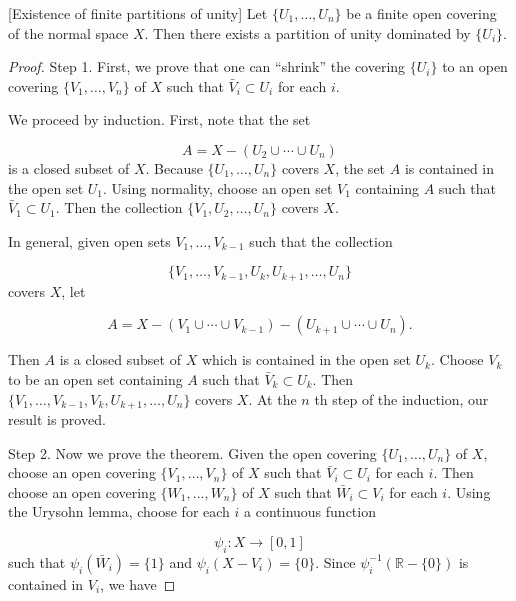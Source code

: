 \begin{theorem}
\label{thm:\thetheorem}[Existence of finite partitions of unity]
 Let \(\{ {U_{1},\ldots ,U_{n}}\}\) be a finite open covering of the normal space \(X\). Then there exists a partition of unity dominated by \(\{ U_{i}\}\).

\end{theorem}
\begin{proof}
 Step 1. First, we prove that one can ``shrink'' the covering \(\{ U_{i}\}\) to an open covering \(\{ {V_{1},\ldots ,V_{n}}\}\) of \(X\) such that \(\bar{V}_{i} \subset {U}_{i}\) for each \(i\).

We proceed by induction. First, note that the set

\[
A = X - ( {U_{2} \cup \cdots \cup {U}_{n}})
\]
is a closed subset of \(X\). Because \(\{ {U_{1},\ldots ,U_{n}}\}\) covers \(X\), the set \(A\) is contained in the open set \(U_{1}\). Using normality, choose an open set \(V_{1}\) containing \(A\) such that \(\bar{V}_{1} \subset {U}_{1}\). Then the collection \(\{ {V_{1},U_{2},\ldots ,U_{n}}\}\) covers \(X\).

In general, given open sets \(V_{1},\ldots ,V_{k - 1}\) such that the collection

\[
\{ {V_{1},\ldots ,V_{k - 1},U_{k},U_{k + 1},\ldots ,U_{n}}\}
\]
covers \(X\), let

\[
A = X - ( {V_{1} \cup \cdots \cup {V}_{k - 1}}) - ( {U_{k + 1} \cup \cdots \cup {U}_{n}}).
\]

Then \(A\) is a closed subset of \(X\) which is contained in the open set \(U_{k}\). Choose \(V_{k}\) to be an open set containing \(A\) such that \(\bar{V}_{k} \subset {U}_{k}\). Then \(\{ {V_{1},\ldots ,V_{k - 1},V_{k},U_{k + 1},\ldots ,U_{n}}\}\) covers \(X\). At the \(n\) th step of the induction, our result is proved.

Step 2. Now we prove the theorem. Given the open covering \(\{ {U_{1},\ldots ,U_{n}}\}\) of \(X\), choose an open covering \(\{ {V_{1},\ldots ,V_{n}}\}\) of \(X\) such that \(\bar{V}_{i} \subset {U}_{i}\) for each \(i\). Then choose an open covering \(\{ {W_{1},\ldots ,W_{n}}\}\) of \(X\) such that \(\bar{W}_{i} \subset {V}_{i}\) for each \(i\). Using the Urysohn lemma, choose for each \(i\) a continuous function

\[
{\psi }_{i} : X \rightarrow [ {0,1}]
\]
such that \({\psi }_{i}( \bar{W}_{i}) = \{ 1\}\) and \({\psi }_{i}( {X - V_{i}}) = \{ 0\}\). Since \({\psi }_i^{-1}( {\mathbb{R} - \{ 0\} })\) is contained in \(V_{i}\), we have


\end{proof}
